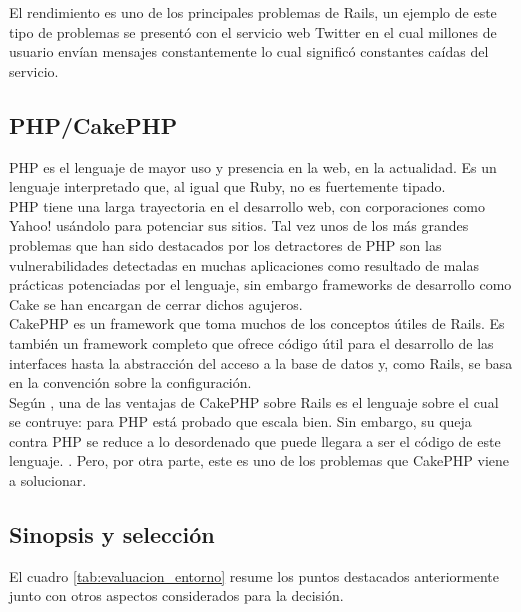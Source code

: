 El rendimiento es uno de los principales problemas de Rails, un ejemplo de este tipo de problemas se presentó con el servicio web Twitter en el cual millones de usuario envían mensajes constantemente lo cual significó constantes caídas del servicio.

\subsection{PHP/CakePHP}
PHP es el lenguaje de mayor uso y presencia en la web, en la actualidad. Es un lenguaje interpretado que, al igual que Ruby, no es fuertemente tipado.\\

PHP tiene una larga trayectoria en el desarrollo web, con corporaciones como Yahoo! usándolo para potenciar sus sitios. Tal vez unos de los más grandes problemas que han sido destacados por los detractores de PHP son las vulnerabilidades detectadas en muchas aplicaciones como resultado de malas prácticas potenciadas por el lenguaje, sin embargo frameworks de desarrollo como Cake se han encargan de cerrar dichos agujeros.\\

CakePHP es un framework que toma muchos de los conceptos útiles de Rails. Es también un framework completo que ofrece código útil para el desarrollo de las interfaces hasta la abstracción del acceso a la base de datos y, como Rails, se basa en la convención sobre la configuración.\\

Según \citeauthor{Heinemeier_2008}, una de las ventajas de CakePHP sobre Rails es el lenguaje sobre el cual se contruye: para PHP está probado que escala bien. Sin embargo, su queja contra PHP se reduce a lo desordenado que puede llegara a ser el código de este lenguaje. \citep{Heinemeier_2008}. Pero, por otra parte, este es uno de los problemas que CakePHP viene a solucionar.

\subsection{Sinopsis y selección}
El cuadro \ref{tab:evaluacion_entorno} resume los puntos destacados anteriormente junto con otros aspectos considerados para la decisión. \\

